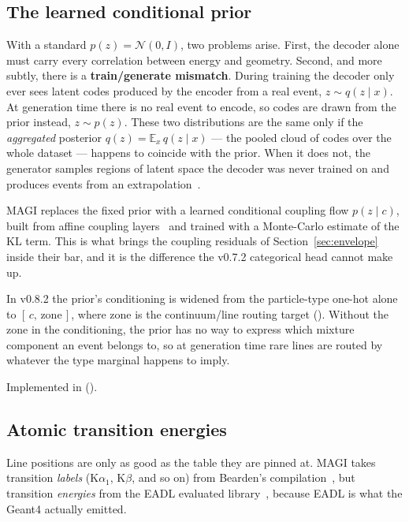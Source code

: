 \documentclass[11pt,a4paper]{article}
\begin{document}
\subsection{The learned conditional prior}

With a standard $p(z) = \mathcal{N}(0,I)$, two problems arise. First, the
decoder alone must carry every correlation between energy and geometry.
Second, and more subtly, there is a \textbf{train/generate mismatch}. During
training the decoder only ever sees latent codes produced by the encoder from a
real event, $z \sim q(z \mid x)$. At generation time there is no real event to
encode, so codes are drawn from the prior instead, $z \sim p(z)$. These two
distributions are the same only if the \emph{aggregated} posterior
$q(z) = \mathbb{E}_{x}\,q(z \mid x)$ --- the pooled cloud of codes over the
whole dataset --- happens to coincide with the prior. When it does not, the
generator samples regions of latent space the decoder was never trained on and
produces events from an extrapolation~\cite{Tomczak2018VampPrior}.

MAGI replaces the fixed prior with a learned conditional coupling flow
$p(z \mid c)$, built from affine coupling layers~\cite{Dinh2017RealNVP} and
trained with a Monte-Carlo estimate of the KL term. This is what brings the
coupling residuals of Section~\ref{sec:envelope} inside their bar, and it is
the difference the v0.7.2 categorical head cannot make up.

In v0.8.2 the prior's conditioning is widened from the particle-type one-hot
alone to $[\,c,\,\text{zone}\,]$, where zone is the continuum/line routing
target (). Without the zone in the
conditioning, the prior has no way to express which mixture component an event
belongs to, so at generation time rare lines are routed by whatever the type
marginal happens to imply.

Implemented in  ().

\subsection{Atomic transition energies}

Line positions are only as good as the table they are pinned at. MAGI takes
transition \emph{labels} (K$\alpha_1$, K$\beta$, and so on) from
Bearden's compilation~\cite{Bearden1967XRayWavelengths}, but transition
\emph{energies} from the EADL evaluated library~\cite{Perkins1991EADL}, because
EADL is what the Geant4  actually emitted.
\end{document}

